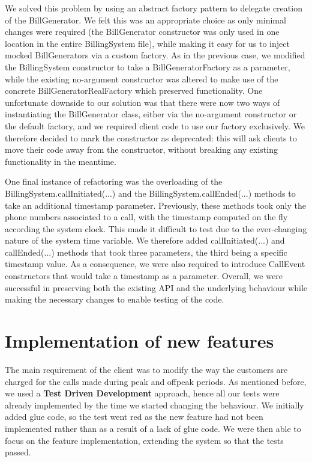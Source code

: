\documentclass[a4paper]{article}
\begin{document}
We solved this problem by using an abstract factory pattern to delegate creation of the BillGenerator. We felt this was an appropriate choice as only minimal changes were required (the BillGenerator constructor was only used in one location in the entire BillingSystem file), while making it easy for us to inject mocked BillGenerators via a custom factory. As in the previous case, we modified the BillingSystem constructor to take a BillGeneratorFactory as a parameter, while the existing no-argument constructor was altered to make use of the concrete BillGeneratorRealFactory which preserved functionality. One unfortunate downside to our solution was that there were now two ways of instantiating the BillGenerator class, either via the no-argument constructor or the default factory, and we required client code to use our factory exclusively. We therefore decided to mark the constructor as deprecated: this will ask clients to move their code away from the constructor, without breaking any existing functionality in the meantime.

One final instance of refactoring was the overloading of the BillingSystem.callInitiated(...) and the BillingSystem.callEnded(...) methods to take an additional timestamp parameter. Previously, these methods took only the phone numbers associated to a call, with the timestamp computed on the fly according the system clock. This made it difficult to test due to the ever-changing nature of the system time variable. We therefore added callInitiated(...) and callEnded(...) methods that took three parameters, the third being a specific timestamp value. As a consequence, we were also required to introduce CallEvent constructors that would take a timestamp as a parameter. Overall, we were successful in preserving both the existing API and the underlying behaviour while making the necessary changes to enable testing of the code.

\section{Implementation of new features}

The main requirement of the client was to modify the way the customers are charged for the calls made during peak and offpeak periods. As mentioned before, we used a {\bf Test Driven Development} approach, hence all our tests were already implemented by the time we started changing the behaviour. We initially added glue code, so the test went red as the new feature had not been implemented rather than as a result of a lack of glue code. We were then able to focus on the feature implementation, extending the system so that the tests passed. 
\end{document}
